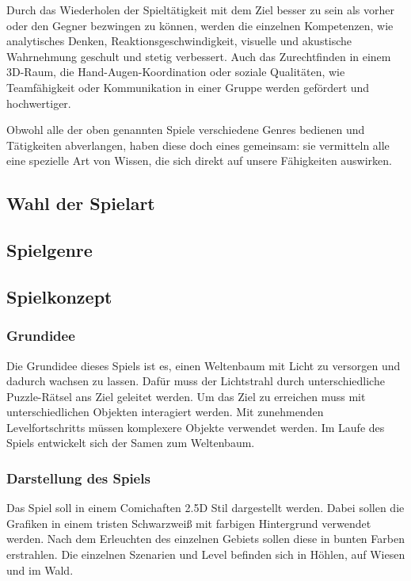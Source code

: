 Durch das Wiederholen der Spieltätigkeit mit dem Ziel besser zu sein als vorher oder den Gegner bezwingen zu können, werden die einzelnen Kompetenzen, wie analytisches Denken, Reaktionsgeschwindigkeit, visuelle und akustische Wahrnehmung geschult und stetig verbessert. Auch das Zurechtfinden in einem 3D-Raum, die Hand-Augen-Koordination oder soziale Qualitäten, wie Teamfähigkeit oder Kommunikation in einer Gruppe werden gefördert und hochwertiger. 

Obwohl alle der oben genannten Spiele verschiedene Genres bedienen und Tätigkeiten abverlangen, haben diese doch eines gemeinsam: sie vermitteln alle eine spezielle Art von Wissen, die sich direkt auf unsere Fähigkeiten auswirken. 

\subsection{Wahl der Spielart}

\subsection{Spielgenre}

\subsection{Spielkonzept}
\subsubsection{Grundidee}
Die Grundidee dieses Spiels ist es, einen Weltenbaum mit Licht zu versorgen und dadurch wachsen zu lassen. Dafür muss der Lichtstrahl durch unterschiedliche Puzzle-Rätsel ans Ziel geleitet werden. Um das Ziel zu erreichen muss mit unterschiedlichen Objekten interagiert werden. Mit zunehmenden Levelfortschritts müssen komplexere Objekte verwendet werden. Im Laufe des Spiels entwickelt sich der Samen zum Weltenbaum.

\subsubsection{Darstellung des Spiels}
Das Spiel soll in einem Comichaften 2.5D Stil dargestellt werden. Dabei sollen die Grafiken in einem tristen Schwarzweiß mit farbigen Hintergrund verwendet werden. Nach dem Erleuchten des einzelnen Gebiets sollen diese in bunten Farben erstrahlen. Die einzelnen Szenarien und Level befinden sich in Höhlen, auf Wiesen und im Wald.

